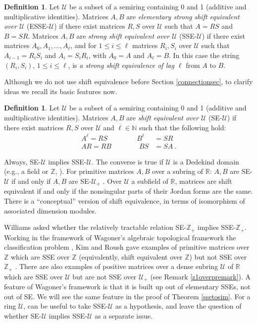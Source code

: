 \documentclass{amsart}
\theoremstyle{definition}
\newtheorem{definition}[theorem]{Definition}
\theoremstyle{remark}
\numberwithin{equation}{section}
\begin{document}
\begin{definition} \label{ssedefn}
Let $\mathcal U$ be a subset of a semiring containing 
0 and 1 (additive and multiplicative identities). 
Matrices $A,B$ are 
{\it elementary strong shift equivalent over $\mathcal U$}
(ESSE-$\mathcal U$) if there exist matrices $R,S$ over $\mathcal U$ 
such that $A=RS$ and $B=SR$. 
 Matrices $A,B$ are {\it strong shift equivalent over $\mathcal U$}  
(SSE-$\mathcal U$) if there exist matrices $A_0, A_1, \dots , A_{\ell}$, 
and for $1\leq i \leq \ell$ matrices $R_i,S_i$ over $\mathcal U$ such 
that $A_{i-1}=R_iS_i$ and $A_i=S_iR_i$, with $A_0=A$ and $A_{\ell}=B$. 
In this case the string $(R_i,S_i)$, $1\leq i \leq \ell$, is 
{\it a strong shift equivalence of lag $\ell$} from $A$ to $B$. 
\end{definition} 

Although we do not use shift equivalence before Section \ref{connectionsec}, 
to clarify ideas we recall its basic features now. 

\begin{definition} \label{sedefn} 
Let $\mathcal U$ be a subset of a semiring containing 
0 and 1 (additive and multiplicative identities). 
Matrices $A,B$ are 
{\it  shift equivalent over $\mathcal U$}
(SE-$\mathcal U$) if there exist matrices $R,S$ over $\mathcal U$ 
and $\ell \in \mathbb N$ such that the following hold: 
\begin{align*} 
A^{\ell} =RS\ \qquad \qquad B^{\ell} &=SR \\ 
AR = RB  \qquad \qquad BS &=SA \ . 
\end{align*}
\end{definition} 

Always, SE-$\mathcal U$ implies SSE-$\mathcal U$. 
The converse is true if $\mathcal U$ is a Dedekind domain \cite{BH2}
(e.g., a field or $\mathbb Z$, \cite{E,Wi2}). 
For primitive matrices $A,B$ over a subring of $\mathbb R$:  
$A,B$ are SE-$\mathcal U$ if and only if  
 $A,B$ are SE-$\mathcal U_+$ . 
Over $\mathcal U$ a subfield of $\mathbb R$, matrices are shift equivalent 
if and only if the nonsingular parts of their Jordan forms are the same. 
There is a ``conceptual'' version of shift equivalence, in terms of 
isomorphism of associated dimension modules. 


Williams asked whether the relatively tractable relation 
SE-$\mathbb Z_+$ implies 
SSE-$\mathbb Z_+$.   
Working in the framework of Wagoner's 
algebraic topological framework the classification 
problem \cite{Wa}, Kim and Roush gave examples of 
primitive matrices over $\mathbb Z$ 
which are SSE over $\mathbb Z$ (equivalently, shift 
equivalent over $\mathbb Z$) but not SSE over 
$\mathbb Z_+$ \cite{KR6}. There are also 
examples of positive matrices over a dense subring $\mathcal U$ 
of $\mathbb R$ which are SSE over $\mathcal U$ but are not 
SSE over $\mathcal U_+$ 
(see Remark \ref{z1overpremark}). A feature of Wagoner's 
framework is that it is built up out of elementary SSEs, 
not out of SE. We will see the same feature in the 
proof of Theorem \ref{ssetosim}. For a ring $\mathcal U$, 
 can be useful to 
take SSE-$\mathcal U$ as a hypothesis, and leave the 
question of whether SE-$\mathcal U$ implies 
SSE-$\mathcal U$  as a separate issue. 
\end{document}
